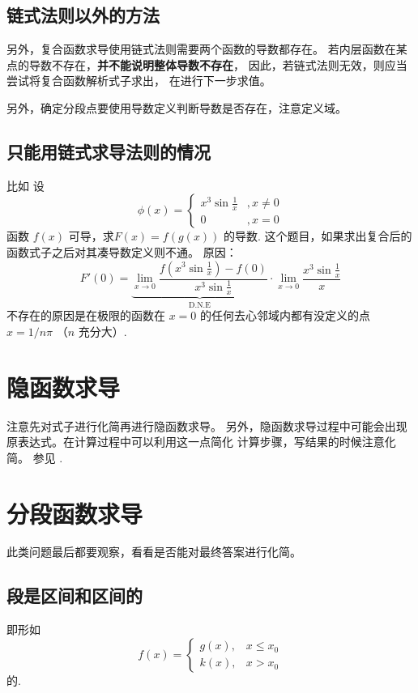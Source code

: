 \subsection{链式法则以外的方法}

另外，复合函数求导使用链式法则需要两个函数的导数都存在。
若内层函数在某点的导数不存在，\textbf{并不能说明整体导数不存在}，
因此，若链式法则无效，则应当尝试将复合函数解析式子求出，
在进行下一步求值。

另外，确定分段点要使用导数定义判断导数是否存在，注意定义域。

\subsection{只能用链式求导法则的情况}

比如 设
\[
    \phi (x) = 
    \left\{
        \begin{array}{rl}
            x^3 \sin \frac{1}{x} &, x \neq 0 \\
            0  &, x = 0
        \end{array}
    \right.
\]
函数 $f(x)$ 可导，求$F(x)=f(g(x))$ 的导数.
这个题目，如果求出复合后的函数式子之后对其凑导数定义则不通。
原因：
\[
    F'(0) = \underbrace{\lim_{x \to 0} \dfrac{f(x^3 \sin \frac{1}{x}) - f(0)}{x^3 \sin \frac{1}{x}}}_{\mbox{D.N.E}}
    \cdot \lim_{x \to 0} \dfrac{x^3 \sin \frac{1}{x}}{x}
\]
不存在的原因是在极限的函数在 $x=0$ 的任何去心邻域内都有没定义的点 $x = 1/n\pi$ （$n$ 充分大）.

\section{隐函数求导}

注意先对式子进行化简再进行隐函数求导。
另外，隐函数求导过程中可能会出现原表达式。在计算过程中可以利用这一点简化
计算步骤，写结果的时候注意化简。
参见 \cite[quest35]{w660}.

\section{分段函数求导}

此类问题最后都要观察，看看是否能对最终答案进行化简。

\subsection{段是区间和区间的}

即形如
\[
    f(x) = 
    \left\{
        \begin{array}{rl}
            g(x), &x \leq x_0 \\
            k(x), &x > x_0
        \end{array}
    \right. 
\]
的.

